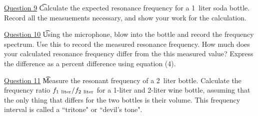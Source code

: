 \documentclass[11pt]{NSF}
\begin{document}
\underline{Question 9} \t Calculate the expected resonance frequency for a 
1~liter soda bottle. Record all the measuements necessary, and show your work for the calculation.

\underline{Question 10} \t Using the microphone, blow into the bottle and record the frequency spectrum. Use this to record the measured resonance frequency. How much does your calculated resonance frequency differ from the this measured value? Express the difference as a percent difference using equation (4).


\underline{Question 11} \t  Measure the resonant frequency of a 2~liter bottle. Calculate the frequency ratio $f_{\rm 1~liter}/f_{\rm 2~liter}$
for a 1-liter and 2-liter wine bottle, assuming that the only thing 
that differs for the two bottles is their volume.
This frequency interval is called a ``tritone" or ``devil's tone".
\end{document}
